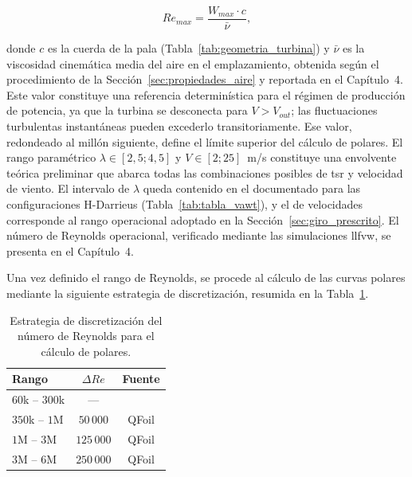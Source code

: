 \begin{equation}
    Re_{max} = \frac{W_{max} \cdot c}{\bar{\nu}},
    \label{eq:Re_max_theoretical}
\end{equation}

donde $c$ es la cuerda de la pala (Tabla~\ref{tab:geometria_turbina}) y $\bar{\nu}$ es la viscosidad cinemática media del aire en el emplazamiento, obtenida según el procedimiento de la Sección~\ref{sec:propiedades_aire} y reportada en el Capítulo~4. Este valor constituye una referencia determinística para el régimen de producción de potencia, ya que la turbina se desconecta para $V > V_{out}$; las fluctuaciones turbulentas instantáneas pueden excederlo transitoriamente. Ese valor, redondeado al millón siguiente, define el límite superior del cálculo de polares. El rango paramétrico $\lambda \in [2{,}5; 4{,}5]$ y $V \in [2; 25]$~m/s constituye una envolvente teórica preliminar que abarca todas las combinaciones posibles de \gls{tsr} y velocidad de viento. El intervalo de $\lambda$ queda contenido en el documentado para las configuraciones H-Darrieus (Tabla~\ref{tab:tabla_vawt}), y el de velocidades corresponde al rango operacional adoptado en la Sección~\ref{sec:giro_prescrito}. El número de Reynolds operacional, verificado mediante las simulaciones \gls{llfvw}, se presenta en el Capítulo~4.

Una vez definido el rango de Reynolds, se procede al cálculo de las curvas polares mediante la siguiente estrategia de discretización, resumida en la Tabla~\ref{tab:reynolds_discretizacion}.

\begin{table}[H]
    \centering
    \caption{Estrategia de discretización del número de Reynolds para el cálculo de polares.}
    \label{tab:reynolds_discretizacion}
    \begin{tabular}{lcc}
        \hline
        \textbf{Rango} & $\Delta Re$ & \textbf{Fuente} \\
        \hline
        $60$k -- $300$k & --- & \cite{Bianchini2015} \\
        $350$k -- $1$M & $50\,000$ & QFoil \\
        $1$M -- $3$M   & $125\,000$ & QFoil \\
        $3$M -- $6$M   & $250\,000$ & QFoil \\
        \hline
    \end{tabular}
\end{table}


